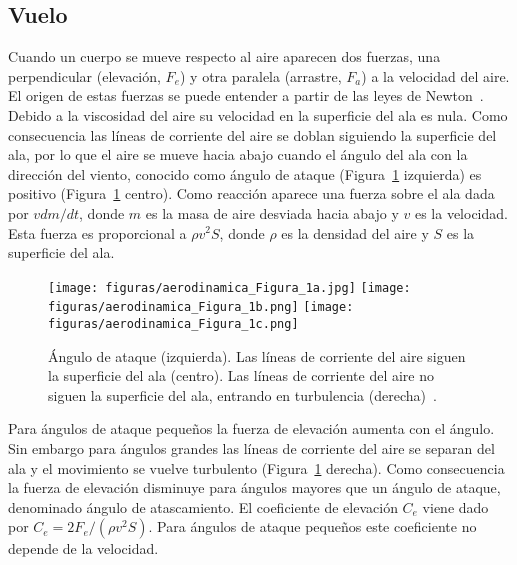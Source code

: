 \documentclass[11pt]{articulo}
\begin{document}
\subsection{Vuelo}

Cuando un cuerpo se mueve respecto al aire aparecen dos fuerzas, una perpendicular (elevaci\'on, $F_e$) y otra paralela (arrastre, $F_a$) a la velocidad del aire. El origen de estas fuerzas se puede entender a partir de las leyes de Newton~\cite{anderson}. Debido a la viscosidad del aire su velocidad en la superficie del ala es nula. Como consecuencia las l\'ineas de corriente del aire se doblan siguiendo la superficie del ala, por lo que el aire se mueve hacia abajo cuando el \'angulo del ala con la direcci\'on del viento, conocido como \'angulo de ataque (Figura~\ref{aerofoil} izquierda) es positivo (Figura~\ref{aerofoil} centro). Como reacci\'on aparece una fuerza sobre el ala dada por $vdm/dt$, donde $m$ es la masa de aire desviada hacia abajo y $v$ es la velocidad. Esta fuerza es proporcional a $\rho v^2S$, donde $\rho$ es la densidad del aire y $S$ es la superficie del ala.

\begin{figure}[htb]
\begin{center}
\hspace*{0.0cm}
\texttt{[image: figuras/aerodinamica\_Figura\_1a.jpg]}
\texttt{[image: figuras/aerodinamica\_Figura\_1b.png]}
\texttt{[image: figuras/aerodinamica\_Figura\_1c.png]}
\end{center}
\vspace*{-0.6cm}
\caption[]{\label{aerofoil}
{\'Angulo de ataque (izquierda). Las l\'ineas de corriente del aire siguen la
superficie del ala (centro). Las l\'ineas de corriente del aire no siguen la
superficie del ala, entrando en turbulencia (derecha)~\cite{babinsky}.}}
\end{figure}

Para \'angulos de ataque peque\~nos la fuerza de elevaci\'on aumenta con el \'angulo. Sin embargo para \'angulos grandes las l\'ineas de corriente del aire se separan del ala y el movimiento se vuelve turbulento (Figura~\ref{aerofoil} derecha). Como consecuencia la fuerza de elevaci\'on disminuye para \'angulos mayores que un \'angulo de ataque, denominado \'angulo de atascamiento. El coeficiente de elevaci\'on $C_e$ viene dado por $C_e = 2 F_e / (\rho v^2 S)$. Para \'angulos de ataque peque\~nos este coeficiente no depende de la velocidad.
\end{document}
